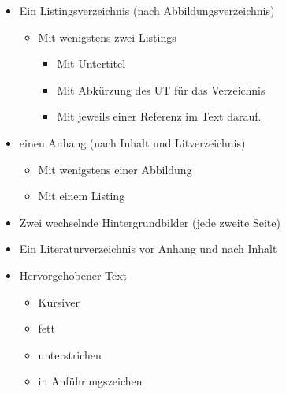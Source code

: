 \begin{itemize}
    \item Ein Listingsverzeichnis (nach Abbildungsverzeichnis)                                  
        \begin{itemize}                                                                         
            \item Mit wenigstens zwei Listings                                                  
                \begin{itemize}                                                                 
                    \item Mit Untertitel                                                        
                    \item Mit Abkürzung des UT für das Verzeichnis                              
                    \item Mit jeweils einer Referenz im Text darauf.                            
                \end{itemize}                                                                   
        \end{itemize}                                                                           
    \item einen Anhang (nach Inhalt und Litverzeichnis)                                         
        \begin{itemize}                                                                         
            \item Mit wenigstens einer Abbildung                                                
            \item Mit einem Listing                                                             
        \end{itemize}                                                                           
    \item Zwei wechselnde Hintergrundbilder (jede zweite Seite)                                            
    \item Ein Literaturverzeichnis vor Anhang und nach Inhalt
    \item Hervorgehobener Text
        \begin{itemize}
            \item Kursiver
            \item fett
            \item unterstrichen
            \item in Anführungszeichen
        \end{itemize}
     

\end{itemize}
